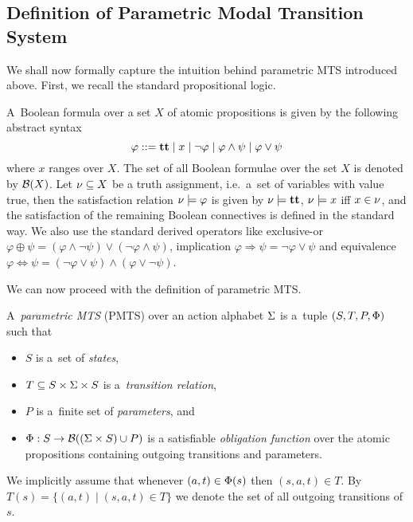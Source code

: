 \subsection{Definition of Parametric Modal Transition System}

We shall now formally capture the intuition behind parametric MTS 
introduced above.
First, we recall the standard
propositional logic.
 

A~Boolean formula over a set $X$ of atomic propositions is given by
the following abstract syntax 
\[ 
\varphi ::= \mathbf{tt} \mid x \mid \neg \varphi \mid \varphi \wedge \psi 
\mid \varphi \vee \psi \]
where $x$ ranges over $X$. 
The set of all Boolean formulae over the set $X$
is denoted by $\mathcal B(X)$. 
Let $\nu \subseteq X$ be a truth assignment, 
i.e.~a~set of variables with value true, then the satisfaction relation
$\nu \models \varphi$ is given by
$\nu \models \mathbf{tt}$, $\nu \models x$ iff $x \in \nu $,
and the satisfaction of the remaining Boolean connectives is defined in the standard way.
We also use the standard derived operators like
exclusive-or  
$\varphi \oplus \psi = (\varphi \wedge \neg \psi) \vee (\neg \varphi 
\wedge \psi)$, implication
$\varphi \Rightarrow \psi = \neg \varphi \vee \psi$ and equivalence $\varphi \Leftrightarrow \psi = (\neg \varphi \vee \psi)\wedge(\varphi \vee \neg \psi)$.

We can now proceed with the definition of parametric MTS.

\begin{definition}
A~\emph{parametric MTS} (PMTS) over an action alphabet $\mathrm{\Sigma}$ is 
a~tuple $(S,T,P,\mathrm{\Phi})$ such that
	\begin{itemize}
	\item 
$S$ is a~set of \emph{states},
\item 
$T \subseteq S \times \mathrm{\Sigma} \times S$ is 
a~\emph{transition relation}, 
\item 
$P$ is a~finite set of \emph{parameters}, and
\item 
$\mathrm{\Phi} : S \to \mathcal B((\mathrm{\Sigma} \times S) \cup P)$ is a satisfiable
\emph{obligation function} over the atomic propositions containing 
outgoing transitions and parameters. 
\end{itemize}
We implicitly assume that whenever $(a,t) \in \mathrm{\Phi}(s)$ then 
$(s,a,t) \in T$.
By $T(s) = \{(a,t) \mid (s,a,t) \in T\}$ we denote the set of 
all outgoing transitions of $s$.
\end{definition}

